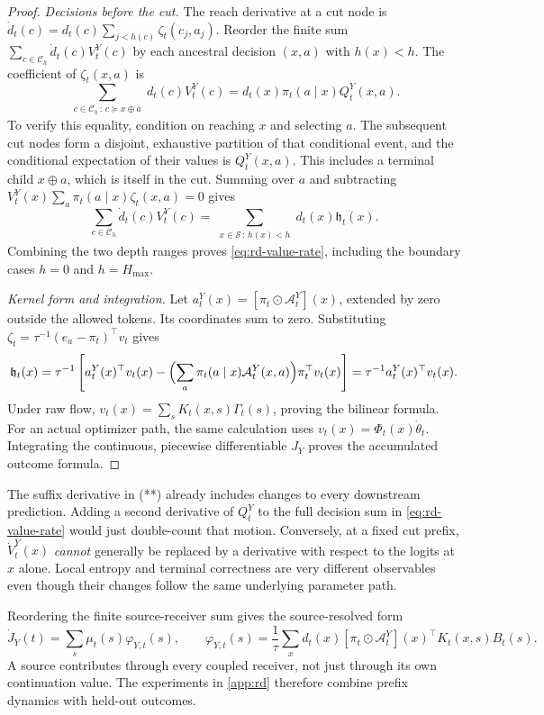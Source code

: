 \begin{proof}
\emph{Decisions before the cut.}
The reach derivative at a cut node is $\dot d_t(c)=d_t(c)\sum_{j<h(c)}\zeta_t(c_j,a_j)$. Reorder the finite sum $\sum_{c\in\mathcal C_h}\dot d_t(c)V_t^Y(c)$ by each ancestral decision $(x,a)$ with $h(x)<h$. The coefficient of $\zeta_t(x,a)$ is
\[
 \sum_{\substack{c\in\mathcal C_h\,:\,c\succeq x\oplus a}}d_t(c)V_t^Y(c)
 =d_t(x)\pi_t(a\mid x)Q_t^Y(x,a).
\]
To verify this equality, condition on reaching $x$ and selecting $a$. The subsequent cut nodes form a disjoint, exhaustive partition of that conditional event, and the conditional expectation of their values is $Q_t^Y(x,a)$. This includes a terminal child $x\oplus a$, which is itself in the cut. Summing over $a$ and subtracting $V_t^Y(x)\sum_a\pi_t(a\mid x)\zeta_t(x,a)=0$ gives
\[
 \sum_{c\in\mathcal C_h}\dot d_t(c)V_t^Y(c)
 =\sum_{\substack{x\in\mathcal S\,:\,h(x)<h}}d_t(x)\mathfrak h_t(x).
\]
Combining the two depth ranges proves \cref{eq:rd-value-rate}, including the boundary cases $h=0$ and $h=H_{\max}$.

\emph{Kernel form and integration.}
Let $a_t^Y(x)=[\pi_t\odot\mathcal A_t^Y](x)$, extended by zero outside the allowed tokens. Its coordinates sum to zero. Substituting $\zeta_t=\tau^{-1}(e_a-\pi_t)^\top v_t$ gives
\[
 \mathfrak h_t(x)
 =\tau^{-1}\left[a_t^Y(x)^\top v_t(x)
  -\Bigl(\sum_a\pi_t(a\mid x)\mathcal A_t^Y(x,a)\Bigr)\pi_t^\top v_t(x)\right]
 =\tau^{-1}a_t^Y(x)^\top v_t(x).
\]
Under raw flow, $v_t(x)=\sum_sK_t(x,s)\Gamma_t(s)$, proving the bilinear formula. For an actual optimizer path, the same calculation uses $v_t(x)=\Phi_t(x)\dot\theta_t$. Integrating the continuous, piecewise differentiable $J_Y$ proves the accumulated outcome formula.
\end{proof}

The suffix derivative in (**) already includes changes to every downstream prediction. Adding a second derivative of $Q_t^Y$ to the full decision sum in \cref{eq:rd-value-rate} would just double-count that motion. Conversely, at a fixed cut prefix, $\dot V_t^Y(x)$ \emph{cannot} generally be replaced by a derivative with respect to the logits at $x$ alone. Local entropy and terminal correctness are very different observables even though their changes follow the same underlying parameter path.

Reordering the finite source-receiver sum gives the source-resolved form
\[
 \dot J_Y(t)=\sum_s\mu_t(s)\varphi_{Y,t}(s),\qquad
 \varphi_{Y,t}(s)=\frac1\tau\sum_xd_t(x)
 [\pi_t\odot\mathcal A_t^Y](x)^\top K_t(x,s)B_t(s).
\]
A source contributes through every coupled receiver, not just through its own continuation value. The experiments in \cref{app:rd} therefore combine prefix dynamics with held-out outcomes.

